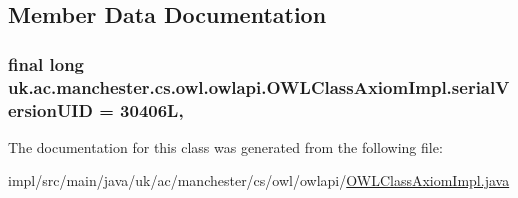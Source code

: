 \subsection{Member Data Documentation}
\hypertarget{classuk_1_1ac_1_1manchester_1_1cs_1_1owl_1_1owlapi_1_1_o_w_l_class_axiom_impl_a3445f9579e80f6d431804851418d07aa}{
\subsubsection[{serial\-Version\-U\-I\-D}]{\setlength{\rightskip}{0pt plus 5cm}final long uk.\-ac.\-manchester.\-cs.\-owl.\-owlapi.\-O\-W\-L\-Class\-Axiom\-Impl.\-serial\-Version\-U\-I\-D = 30406\-L\hspace{0.3cm}{\ttfamily [static]}, {\ttfamily [private]}}}\label{classuk_1_1ac_1_1manchester_1_1cs_1_1owl_1_1owlapi_1_1_o_w_l_class_axiom_impl_a3445f9579e80f6d431804851418d07aa}


The documentation for this class was generated from the following file\-:\begin{DoxyCompactItemize}
\item 
impl/src/main/java/uk/ac/manchester/cs/owl/owlapi/\hyperlink{_o_w_l_class_axiom_impl_8java}{O\-W\-L\-Class\-Axiom\-Impl.\-java}\end{DoxyCompactItemize}
